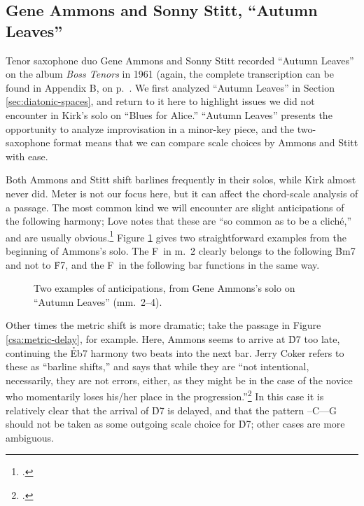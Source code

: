 \subsection{Gene Ammons and Sonny Stitt, ``Autumn Leaves''}
\label{subsec:tenors-autumn-leaves}

Tenor saxophone duo Gene Ammons and Sonny Stitt recorded ``Autumn Leaves'' on
the album \emph{Boss Tenors} in 1961 (again, the complete transcription can be
found in Appendix B, on p.~\pageref{transcription:autumn-leaves}. We first
analyzed ``Autumn Leaves'' in Section \ref{sec:diatonic-spaces}, and return to
it here to highlight issues we did not encounter in Kirk's solo on ``Blues for
Alice.'' ``Autumn Leaves'' presents the opportunity to analyze improvisation
in a minor-key piece, and the two-saxophone format means that we can compare
scale choices by Ammons and Stitt with ease.

Both Ammons and Stitt shift barlines frequently in their solos, while Kirk
almost never did. Meter is not our focus here, but it can affect the
chord-scale analysis of a passage. The most common kind we will
encounter are slight anticipations of the following harmony; Love notes that
these are ``so common as to be a cliché,'' and are usually
obvious.\footcite[51]{love:2013} Figure \ref{csa:anticipation-simple} gives
two straightforward examples from the beginning of Ammons's solo. The F\sharp\
in m.~2 clearly belongs to the following \h{Bm7} and not to \h{F7}, and the
F\nat\ in the following bar functions in the same way.

\begin{figure}[tbp]
  \caption[Two examples of anticipations, from Gene Ammons's solo on ``Autumn
    Leaves.''~2--4).]{Two examples of anticipations, from Gene Ammons's solo on
    ``Autumn Leaves'' (mm.~2--4).}
  \label{csa:anticipation-simple}
\end{figure}

Other times the metric shift is more dramatic; take the passage in Figure
\ref{csa:metric-delay}, for example. Here, Ammons seems to arrive at \h{D7}
too late, continuing the \h{Eb7} harmony two beats into the next bar. Jerry
Coker refers to these as ``barline shifts,'' and says that while they are
``not intentional, necessarily, they are not errors, either, as they might be
in the case of the novice who momentarily loses his/her place in the
progression.''\footcite[83]{coker:elements} In this case it is relatively
clear that the arrival of \h{D7} is delayed, and that the pattern
\Dflat--C--\Bflat--G should not be taken as some outgoing scale choice for
\h{D7}; other cases are more ambiguous.


